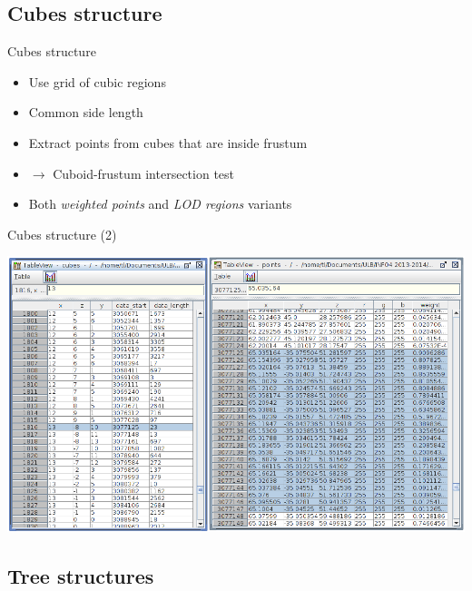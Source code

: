 \documentclass{beamer}
\begin{document}
\subsection{Cubes structure}

\begin{frame}{Cubes structure}
	\begin{itemize}
	\item Use grid of cubic regions
	\item Common side length
	\item Extract points from cubes that are inside frustum
	\item $\rightarrow$ Cuboid-frustum intersection test
	\item Both \emph{weighted points} and \emph{LOD regions} variants
	\end{itemize}
\end{frame}

\begin{frame}{Cubes structure (2)}
	\begin{center}
	\includegraphics[width=\textwidth]{cubes_hdf.png} \\
	\end{center}
\end{frame}

\subsection{Tree structures}
\end{document}
